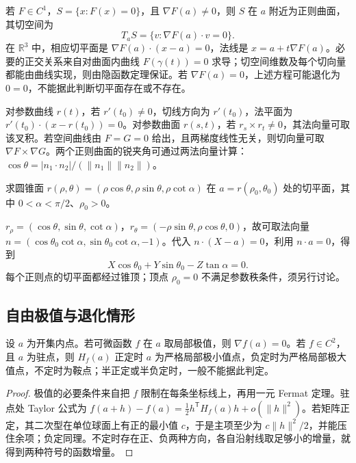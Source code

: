 若 $F\in C^1$，$S=\{x:F(x)=0\}$，且 $\nabla F(a)\ne0$，则 $S$ 在 $a$ 附近为正则曲面，其切空间为
\[
T_aS=\{v:\nabla F(a)\cdot v=0\}.
\]
在 $\mathbb R^3$ 中，相应切平面是 $\nabla F(a)\cdot(x-a)=0$，法线是 $x=a+t\nabla F(a)$。必要的正交关系来自对曲面内曲线 $F(\gamma(t))=0$ 求导；切空间维数及每个切向量都能由曲线实现，则由隐函数定理保证。若 $\nabla F(a)=0$，上述方程可能退化为 $0=0$，不能据此判断切平面存在或不存在。

对参数曲线 $r(t)$，若 $r'(t_0)\ne0$，切线方向为 $r'(t_0)$，法平面为 $r'(t_0)\cdot(x-r(t_0))=0$。对参数曲面 $r(s,t)$，若 $r_s\times r_t\ne0$，其法向量可取该叉积。若空间曲线由 $F=G=0$ 给出，且两梯度线性无关，则切向量可取 $\nabla F\times\nabla G$。两个正则曲面的锐夹角可通过两法向量计算：$\cos\theta=|n_1\cdot n_2|/(\|n_1\|\|n_2\|)$。

\begin{example}
求圆锥面 $r(\rho,\theta)=(\rho\cos\theta,\rho\sin\theta,\rho\cot\alpha)$ 在 $a=r(\rho_0,\theta_0)$ 处的切平面，其中 $0<\alpha<\pi/2$、$\rho_0>0$。
\end{example}
\begin{solve}
$r_\rho=(\cos\theta,\sin\theta,\cot\alpha)$，$r_\theta=(-\rho\sin\theta,\rho\cos\theta,0)$，故可取法向量 $n=(\cos\theta_0\cot\alpha,\sin\theta_0\cot\alpha,-1)$。代入 $n\cdot(X-a)=0$，利用 $n\cdot a=0$，得到
\[
X\cos\theta_0+Y\sin\theta_0-Z\tan\alpha=0.
\]
每个正则点的切平面都经过锥顶；顶点 $\rho_0=0$ 不满足参数秩条件，须另行讨论。
\end{solve}

\subsection{自由极值与退化情形}

\begin{theorem}
\label{thm:pei-unconstrained-extrema}
设 $a$ 为开集内点。若可微函数 $f$ 在 $a$ 取局部极值，则 $\nabla f(a)=0$。若 $f\in C^2$，且 $a$ 为驻点，则 $H_f(a)$ 正定时 $a$ 为严格局部极小值点，负定时为严格局部极大值点，不定时为鞍点；半正定或半负定时，一般不能据此判定。
\end{theorem}
\begin{proof}
极值的必要条件来自把 $f$ 限制在每条坐标线上，再用一元 Fermat 定理。驻点处 Taylor 公式为 $f(a+h)-f(a)=\tfrac12h^{\mathsf T}H_f(a)h+o(\|h\|^2)$。若矩阵正定，其二次型在单位球面上有正的最小值 $c$，于是主项至少为 $c\|h\|^2/2$，并能压住余项；负定同理。不定时存在正、负两种方向，各自沿射线取足够小的增量，就得到两种符号的函数增量。
\end{proof}

